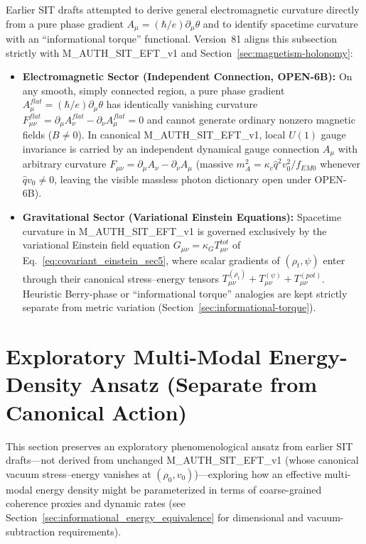 \documentclass[american,11pt,letterpaper]{article}
\def\mathbf#1{#1}%
\def\mathrm#1{#1}%
\def\texttt#1{#1}%
\def\emph#1{#1}%
\begin{document}
Earlier SIT drafts attempted to derive general electromagnetic curvature directly from a pure phase gradient $A_\mu = (\hbar/e)\partial_\mu\theta$ and to identify spacetime curvature with an ``informational torque'' functional. Version~81 aligns this subsection strictly with \texttt{M\_AUTH\_SIT\_EFT\_v1} and Section~\ref{sec:magnetism-holonomy}:
\begin{itemize}
  \item \textbf{Electromagnetic Sector (Independent Connection, \texttt{OPEN-6B}):} On any smooth, simply connected region, a pure phase gradient $A_\mu^{\mathrm{flat}} = (\hbar/e)\partial_\mu\theta$ has identically vanishing curvature $F_{\mu\nu}^{\mathrm{flat}} = \partial_\mu A_\nu^{\mathrm{flat}} - \partial_\nu A_\mu^{\mathrm{flat}} = 0$ and cannot generate ordinary nonzero magnetic fields ($\mathbf{B} \ne 0$). In canonical \texttt{M\_AUTH\_SIT\_EFT\_v1}, local $U(1)$ gauge invariance is carried by an \emph{independent} dynamical gauge connection $A_\mu$ with arbitrary curvature $F_{\mu\nu} = \partial_\mu A_\nu - \partial_\nu A_\mu$ (massive $m_A^2 = \kappa_c\hat{q}^2 v_0^2/f_{\mathrm{EM}0}$ whenever $\hat{q}v_0 \ne 0$, leaving the visible massless photon dictionary open under \texttt{OPEN-6B}).
  \item \textbf{Gravitational Sector (Variational Einstein Equations):} Spacetime curvature in \texttt{M\_AUTH\_SIT\_EFT\_v1} is governed exclusively by the variational Einstein field equation $G_{\mu\nu} = \kappa_G T_{\mu\nu}^{\mathrm{tot}}$ of Eq.~\eqref{eq:covariant_einstein_sec5}, where scalar gradients of $(\rho_t, \psi)$ enter through their canonical stress--energy tensors $T_{\mu\nu}^{(\rho_t)} + T_{\mu\nu}^{(\psi)} + T_{\mu\nu}^{(\mathrm{pot})}$. Heuristic Berry-phase or ``informational torque'' analogies are kept strictly separate from metric variation (Section~\ref{sec:informational-torque}).
\end{itemize}

\section{Exploratory Multi-Modal Energy-Density Ansatz (Separate from Canonical Action)}
\label{sec:integrated_functional}

This section preserves an exploratory phenomenological ansatz from earlier SIT drafts---\emph{not} derived from unchanged \texttt{M\_AUTH\_SIT\_EFT\_v1} (whose canonical vacuum stress--energy vanishes at $(\rho_0, v_0)$)---exploring how an effective multi-modal energy density might be parameterized in terms of coarse-grained coherence proxies and dynamic rates (see Section~\ref{sec:informational_energy_equivalence} for dimensional and vacuum-subtraction requirements).
\end{document}
